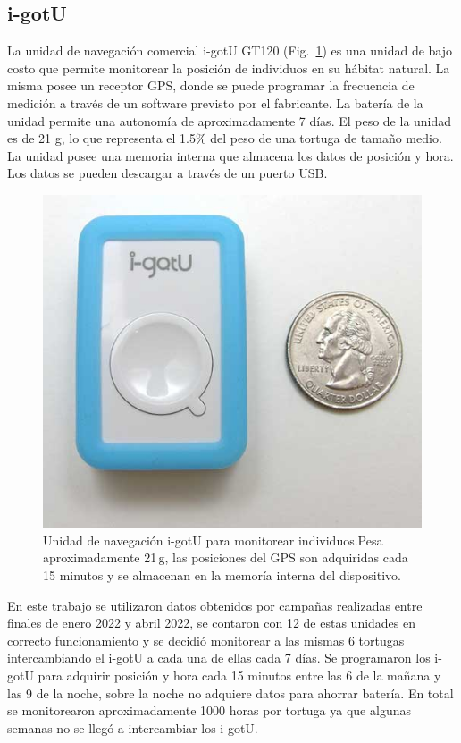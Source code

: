 \subsection{i-gotU}
La unidad de navegación comercial i-gotU GT120 (Fig.~\ref{fig:igotu}) es una unidad de bajo costo que permite monitorear la posición de individuos en su hábitat natural. La misma posee un receptor GPS, donde se puede programar la frecuencia de medición a través de un software previsto por el fabricante. La batería de la unidad permite una autonomía de aproximadamente 7 días. El peso de la unidad es de 21 g, lo que representa el 1.5\% del peso de una tortuga de tamaño medio. La unidad  posee una memoria interna que almacena los datos de posición y hora. Los datos se pueden descargar a través de un puerto USB.
 
\begin{figure}[ht]
    \begin{center}
       
   
    \includegraphics[width=.8\imsize]{figs/Chap1/igotu.jpg}  
\end{center}
    \caption[Unidad de navegación comercial i-gotU para monitorear individuos.] {Unidad de navegación i-gotU para monitorear individuos.Pesa aproximadamente  21\,g, las posiciones del GPS son adquiridas cada 15 minutos y se almacenan en la memoría interna del dispositivo. }
    \label{fig:igotu}
\end{figure}
En este trabajo se utilizaron datos obtenidos por campañas realizadas entre finales de enero 2022 y abril 2022, se contaron con 12 de estas unidades en correcto funcionamiento y se decidió monitorear a las mismas 6 tortugas intercambiando el i-gotU a cada una de ellas cada 7 días. Se programaron los i-gotU para adquirir posición y hora cada 15 minutos entre las 6 de la mañana y las 9 de la noche, sobre la noche no adquiere datos para ahorrar batería. En total se monitorearon aproximadamente 1000 horas por tortuga ya que algunas semanas no se llegó a intercambiar los i-gotU.
 
